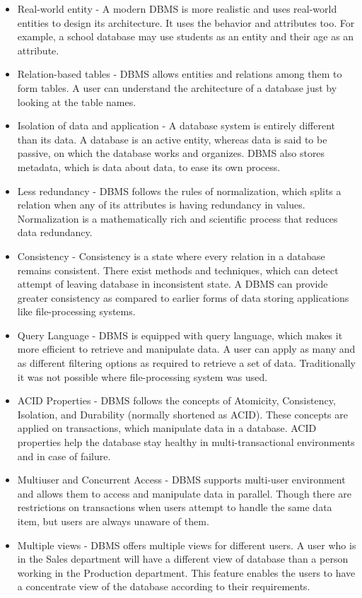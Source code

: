 \begin{itemize}
\item{Real-world entity} - A modern DBMS is more realistic and uses real-world entities to design its architecture. It uses the behavior and attributes too. For example, a school database may use students as an entity and their age as an attribute.
\item{Relation-based tables} - DBMS allows entities and relations among them to form tables. A user can understand the architecture of a database just by looking at the table names.
\item{Isolation of data and application} - A database system is entirely different than its data. A database is an active entity, whereas data is said to be passive, on which the database works and organizes. DBMS also stores metadata, which is data about data, to ease its own process.
\item{Less redundancy} - DBMS follows the rules of normalization, which splits a relation when any of its attributes is having redundancy in values. Normalization is a mathematically rich and scientific process that reduces data redundancy.
\item{Consistency} - Consistency is a state where every relation in a database remains consistent. There exist methods and techniques, which can detect attempt of leaving database in inconsistent state. A DBMS can provide greater consistency as compared to earlier forms of data storing applications like file-processing systems.
\item{Query Language} - DBMS is equipped with query language, which makes it more efficient to retrieve and manipulate data. A user can apply as many and as different filtering options as required to retrieve a set of data. Traditionally it was not possible where file-processing system was used.
\item{ACID Properties} - DBMS follows the concepts of Atomicity, Consistency, Isolation, and Durability (normally shortened as ACID). These concepts are applied on transactions, which manipulate data in a database. ACID properties help the database
stay healthy in multi-transactional environments and in case of failure.
\item{Multiuser and Concurrent Access} - DBMS supports multi-user environment and allows them to access and manipulate data in parallel. Though there are restrictions on transactions when users attempt to handle the same data item, but users are always unaware of them.
\item{Multiple views} - DBMS offers multiple views for different users. A user who is in the Sales department will have a different view of database than a person working in the Production department. This feature enables the users to have a concentrate view of the database according to their requirements.

\end{itemize}
